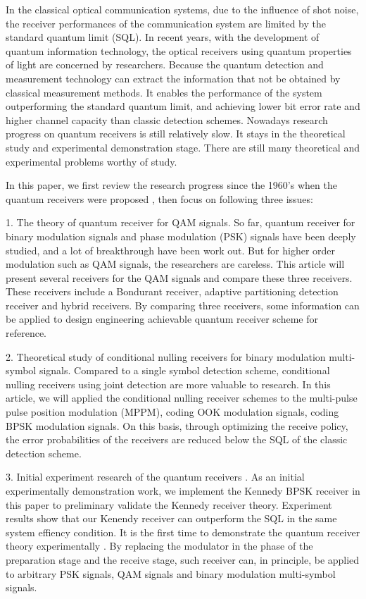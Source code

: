 \begin{enabstract}
In the classical optical communication systems, 
due to the influence of shot noise,
the receiver performances of the communication system  
are limited by the standard quantum limit (SQL).
In recent years, with the development of quantum information technology, 
the optical receivers using quantum properties of light 
are concerned by researchers.
Because the quantum detection and measurement  technology can extract the information 
that not be obtained by classical measurement methods.
It enables the performance of the system outperforming the standard quantum limit,
and achieving lower bit error rate and higher channel capacity than classic detection schemes.
Nowadays research progress on quantum receivers is still relatively slow. 
It stays in the theoretical study and experimental demonstration stage.
There are still many theoretical and experimental problems worthy of study.


In this paper, we first review the research progress since the 1960's when the quantum receivers were proposed ,
then focus on following three issues:


1. The theory of quantum receiver for QAM signals.
So far, quantum receiver for binary modulation signals and phase modulation (PSK) signals 
have been deeply studied, and a lot of breakthrough have been work out.
But for higher order modulation such as QAM signals, the researchers are careless.
This article will present several receivers for the QAM signals and compare these three receivers.
These receivers include a  Bondurant receiver, 
adaptive partitioning detection receiver and hybrid receivers.
By comparing three receivers, some information can be applied to 
design engineering achievable quantum receiver scheme for reference.

2. Theoretical study of conditional nulling receivers for binary modulation multi-symbol signals.
Compared to a single symbol detection scheme, conditional nulling receivers using joint detection  
are more valuable to research. In this article, we will applied the conditional nulling receiver schemes
to the multi-pulse pulse position modulation (MPPM), coding OOK modulation signals,
coding BPSK modulation signals. On this basis, through optimizing the receive policy,
the error probabilities of the receivers are reduced below the SQL of the classic detection scheme.

3. Initial experiment research of  the quantum receivers .
As an initial  experimentally  demonstration work, we implement the Kennedy BPSK receiver in this paper 
to preliminary validate the Kennedy receiver theory.
Experiment results show that our Kenendy receiver can outperform the SQL in the same system effiency condition.
It is the first time to demonstrate the quantum receiver theory  experimentally .
By replacing the modulator in the phase of the preparation stage and the receive stage,
such receiver can, in principle, be applied to arbitrary PSK signals, QAM signals and binary modulation multi-symbol signals.

\end{enabstract}

